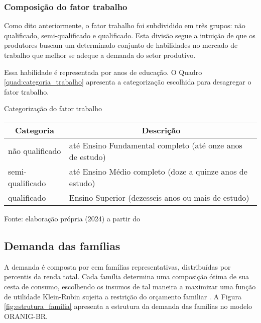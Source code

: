 \subsubsection{Composição do fator trabalho} \label{}

Como dito anteriormente, o fator trabalho foi subdividido em três grupos: não qualificado, semi-qualificado e qualificado. Esta divisão segue a intuição de que os produtores buscam um determinado conjunto de habilidades no mercado de trabalho que melhor se adeque a demanda do setor produtivo.

Essa habilidade é representada por anos de educação. O Quadro \ref{quad:categoria_trabalho} apresenta a categorização escolhida para desagregar o fator trabalho.

\begin{quadro}[h]
	\centering
	\begin{threeparttable}
		\caption{Categorização do fator trabalho} \label{quad:categoria_trabalho}
		\footnotesize
		\begin{tabular}{|| m{3cm} | m{9cm} ||}
			\hline \hline
			\multicolumn{1}{||c|}{\textbf{Categoria}} & \multicolumn{1}{c||}{\textbf{Descrição}} \\ \hline
			não qualificado  & até Ensino Fundamental completo (até onze anos de estudo) \\ \hline 
			semi-qualificado & até Ensino Médio completo (doze a quinze anos de estudo) \\ \hline
			qualificado      & Ensino Superior (dezesseis anos ou mais de estudo) \\ \hline \hline
		\end{tabular}
		\begin{tablenotes}
			\scriptsize
			\item Fonte: elaboração própria (2024) a partir do \textcite{inep04}
		\end{tablenotes}
	\end{threeparttable}
\end{quadro}

\subsection{Demanda das famílias} \label{subsec:demanda_familias}



A demanda é composta por cem famílias representativas, distribuídas por percentis da renda total. Cada família determina uma composição ótima de sua cesta de consumo, escolhendo os insumos de tal maneira a maximizar uma função de utilidade Klein-Rubin sujeita a restrição do orçamento familiar \cite{horridge03}. A Figura \ref{fig:estrutura_familia} apresenta a estrutura da demanda das famílias no modelo ORANIG-BR.

